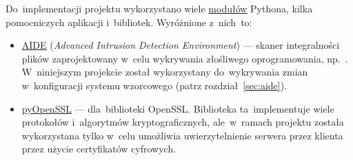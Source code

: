 \documentclass[thesis]{subfiles}
\begin{document}
Do~implementacji projektu wykorzystano wiele \href{https://docs.python.org/dev/tutorial/modules.html}{modułów} Pythona, kilka pomocniczych aplikacji i~bibliotek. Wyróżnione z~nich~to:
\begin{itemize}
	\item \href{http://aide.sourceforge.net/}{AIDE} (\emph{Advanced Intrusion Detection Environment}) --- skaner integralności plików zaprojektowany w~celu wykrywania złośliwego oprogramowania, np.~. W~niniejszym projekcie został wykorzystany do~wykrywania zmian w~konfiguracji systemu wzorcowego (patrz rozdział~\ref{sec:aide}).
	\item \href{http://www.pyopenssl.org/}{pyOpenSSL} ---  dla~biblioteki OpenSSL. Biblioteka ta~implementuje wiele protokołów i~algorytmów kryptograficznych, ale~w~ramach projektu została wykorzystana tylko w~celu umożliwia uwierzytelnienie serwera przez klienta przez użycie certyfikatów cyfrowych.

\end{itemize}
\end{document}
